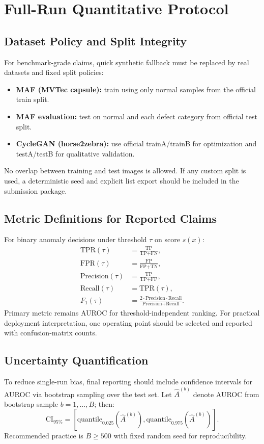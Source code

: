 \documentclass[conference]{IEEEtran}
\begin{document}
\section{Full-Run Quantitative Protocol}
\subsection{Dataset Policy and Split Integrity}
For benchmark-grade claims, quick synthetic fallback must be replaced by real datasets and fixed split policies:
\begin{itemize}
\item \textbf{MAF (MVTec capsule):} train using only normal samples from the official train split.
\item \textbf{MAF evaluation:} test on normal and each defect category from official test split.
\item \textbf{CycleGAN (horse2zebra):} use official trainA/trainB for optimization and testA/testB for qualitative validation.
\end{itemize}
No overlap between training and test images is allowed. If any custom split is used, a deterministic seed and explicit list export should be included in the submission package.

\subsection{Metric Definitions for Reported Claims}
For binary anomaly decisions under threshold $\tau$ on score $s(x)$:
\begin{align}
\text{TPR}(\tau) &= \frac{\text{TP}}{\text{TP}+\text{FN}}, \\
\text{FPR}(\tau) &= \frac{\text{FP}}{\text{FP}+\text{TN}}, \\
\text{Precision}(\tau) &= \frac{\text{TP}}{\text{TP}+\text{FP}}, \\
\text{Recall}(\tau) &= \text{TPR}(\tau), \\
F_1(\tau) &= \frac{2\cdot \text{Precision}\cdot \text{Recall}}
{\text{Precision}+\text{Recall}}.
\end{align}
Primary metric remains AUROC for threshold-independent ranking. For practical deployment interpretation, one operating point should be selected and reported with confusion-matrix counts.

\subsection{Uncertainty Quantification}
To reduce single-run bias, final reporting should include confidence intervals for AUROC via bootstrap sampling over the test set. Let $\widehat{A}^{(b)}$ denote AUROC from bootstrap sample $b=1,\dots,B$; then:
\begin{equation}
\text{CI}_{95\%} = \left[
\text{quantile}_{0.025}\left(\widehat{A}^{(b)}\right),
\text{quantile}_{0.975}\left(\widehat{A}^{(b)}\right)
\right].
\end{equation}
Recommended practice is $B\ge 500$ with fixed random seed for reproducibility.
\end{document}
